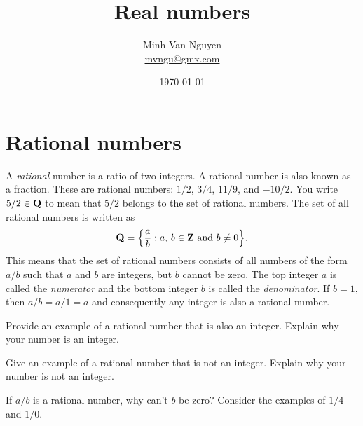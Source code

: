 \documentclass[a4paper,oneside,12pt]{article}
\begin{document}
\title{\Large\bf Real numbers}
\author{%
  Minh Van Nguyen \\
  \url{mvngu@gmx.com}
}
\date{\today}
\maketitle


\section{Rational numbers}

A \emph{rational} number is a ratio of two integers.  A
rational number is also known as a fraction.  These are rational
numbers: $1/2$, $3/4$, $11/9$, and $-10/2$.  You write $5/2 \in \mathbf{Q}$
to mean that $5/2$ belongs to the set of rational numbers.  The set of
all rational numbers is written as
\[
\QQ
=
\setdes{
  \frac{a}{b}
}{
  \pair{a}{b} \in \ZZ
  \text{ and }
  b \neq 0
}.
\]
This means that the set of rational numbers consists of all numbers of
the form $a/b$ such that $a$ and $b$ are integers, but $b$ cannot be
zero.  The top integer $a$ is called the \emph{numerator} and the
bottom integer $b$ is called the \emph{denominator}.  If $b = 1$, then
$a/b = a/1 = a$ and consequently any integer is also a rational
number.

\begin{exercise}
Provide an example of a rational number that is also an integer.
Explain why your number is an integer.
\end{exercise}


\begin{exercise}
Give an example of a rational number that is not an integer.  Explain
why your number is not an integer.
\end{exercise}


\begin{exercise}
If $a/b$ is a rational number, why can't $b$ be zero?  Consider the
examples of $1/4$ and $1/0$.
\end{exercise}
\end{document}
